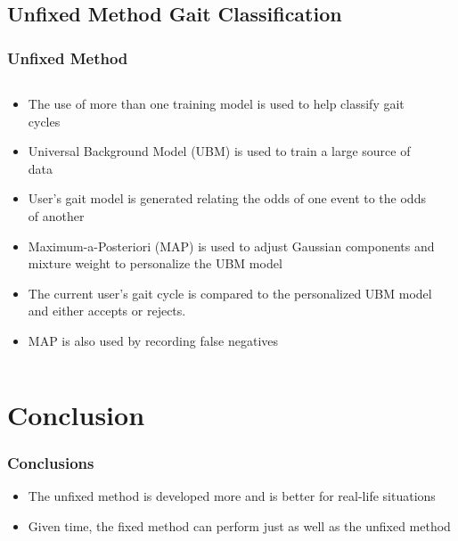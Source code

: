 \documentclass{beamer}
\begin{document}
\subsection{Unfixed Method Gait Classification}
 \begin{frame}
\frametitle{Unfixed Method }
 \begin{columns}
  \begin{column}{.9\textwidth}
  \begin{itemize}
  		\item The use of more than one training model is used to help classify gait cycles
  		
		\item Universal Background Model (UBM) is used to train a large source of data
	
		\item User's gait model is generated relating the odds of one event to the odds of another
		
		\item Maximum-a-Posteriori (MAP) is used to adjust Gaussian components and mixture weight to personalize the UBM model
		
		\item The current user's gait cycle is compared to the personalized UBM model and either accepts or rejects.

		\item MAP is also used by recording false negatives
  \end{itemize}
  \end{column}
  \begin{column}{0.2\textwidth}
       \\
  \end{column}
  \end{columns}  
\end{frame}

\section[Conclusion]{Conclusion}
\begin{frame}
\frametitle{Conclusions}
	\begin{itemize}
		\item The unfixed method is developed more and is better for real-life situations
		\linebreak
		\item Given time, the fixed method can perform just as well as the unfixed method
	\end{itemize}
	
\end{frame}
\end{document}
